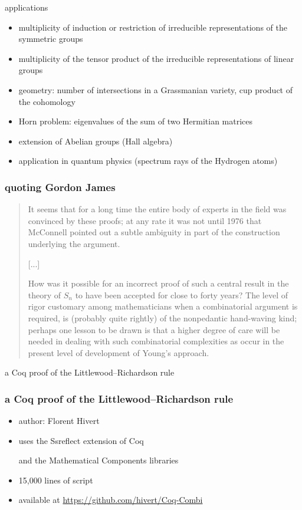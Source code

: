 \documentclass{beamer}
\let\emph\alert
\begin{document}
\begin{frame}{applications}
  \begin{itemize}
  \item multiplicity of induction or restriction of irreducible representations
    of the symmetric groups
  \item multiplicity of the tensor product of the irreducible representations
    of linear groups
  \item geometry: number of intersections in a Grassmanian variety, cup product
    of the cohomology
  \item Horn problem: eigenvalues of the sum of two Hermitian matrices
  \item extension of Abelian groups (Hall algebra)
  \item application in quantum physics (spectrum rays of the Hydrogen atoms)
  \end{itemize}
\end{frame}

\begin{frame}\frametitle{quoting Gordon James}
  \begin{quote}
    It seems that for a long time the entire body of experts in the
    field was convinced by these proofs; at any rate it was not until
    1976 that McConnell pointed out a subtle ambiguity in part of
    the construction underlying the argument.

    [...]

    How was it possible for an incorrect proof of such a central
    result in the theory of $S_n$ to have been accepted for close to
    forty years? The level of rigor customary among mathematicians
    when a combinatorial argument is required, is (probably quite
    rightly) of the nonpedantic hand-waving kind; perhaps one lesson
    to be drawn is that \emph{a higher degree of care will be needed} in
    dealing with such combinatorial complexities as occur in the
    present level of development of Young's approach.
  \end{quote}
\end{frame}

\begin{frame}
  \begin{center}
    \emph{a Coq proof of the Littlewood–Richardson rule} \\
    \hrulefill
  \end{center}
\end{frame}

\begin{frame}\frametitle{a Coq proof of the Littlewood–Richardson rule}
  \begin{itemize}
  \item author: Florent Hivert
  \item uses the Ssreflect extension of Coq \par
    and the Mathematical Components libraries
  \item 15,000 lines of script
  \item available at \url{https://github.com/hivert/Coq-Combi}
  \end{itemize}
\end{frame}
\end{document}
